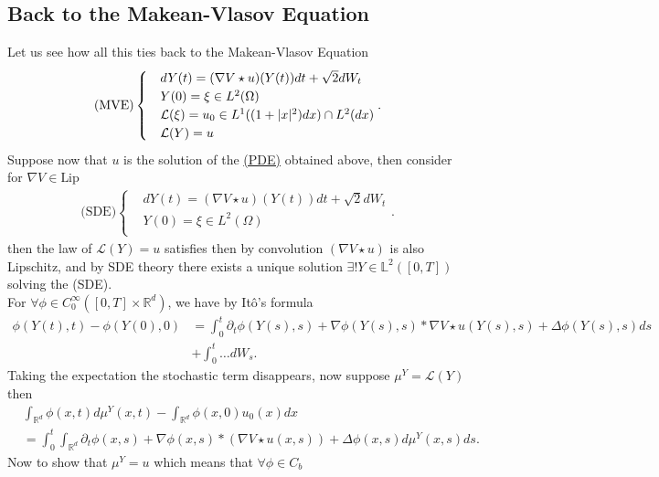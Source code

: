 \subsection{Back to the Makean-Vlasov Equation}
Let us see how all this ties back to the Makean-Vlasov Equation
\begin{align*}
  \text{(MVE)}\begin{cases}
    &dY(t) = (\nabla V \star  u)(Y(t)) dt + \sqrt{2}dW_t \\
    &Y(0)  = \xi \in  L^{2}(\Omega )\\
    &\mathcal{L}(\xi) = u_0 \in  L^{1}((1+\lvert x\rvert^2)dx) \cap L^{2}(dx) \\
    &\mathcal{L}(Y) = u
  \end{cases}
.\end{align*}
Suppose now that $u$ is the solution of the  \hyperref[pde_mve_apprach]{(PDE)} obtained above, then consider 
for $\nabla V \in  \text{Lip}$ 
\begin{align*} 
  \text{(SDE)}\begin{cases}
    &dY(t) = (\nabla V \star  u)(Y(t)) dt + \sqrt{2}dW_t \\
    &Y(0)  = \xi \in  L^{2}(\Omega )\\
  \end{cases}
.\end{align*}
then the law of $\mathcal{L}(Y) = u$ satisfies 
then by convolution  $(\nabla V \star  u)$ is also Lipschitz, and by SDE theory there exists a unique solution $\exists! Y \in  \mathbb{L}^2([0,T])$  solving the (SDE).\\[1ex]
For $\forall  \phi  \in   C_0^{\infty}([0,T] \times  \mathbb{R}^{d} ) $, we have by It\^o's formula 
\begin{align*}
  \phi(Y(t),t) - \phi(Y(0),0) &= \int_0^{t}  \partial_t \phi(Y(s),s) + \nabla \phi(Y(s),s)* \nabla V \star u(Y(s),s) +\Delta \phi(Y(s),s) ds \\
                              &+ \int_0^{t}  \ldots  dW_s
.\end{align*}
Taking the expectation the stochastic term disappears, now suppose $\mu ^{Y} = \mathcal{L}(Y) $ then
\begin{align*}
  &\int_{\mathbb{R}^{d} } \phi(x,t) d\mu ^{Y}(x,t) - \int_{\mathbb{R}^{d} } \phi(x,0) u_0(x) dx \\
  &= \int_0^{t} \int_{\mathbb{R}^{d} } \partial_t \phi(x,s) + \nabla \phi(x,s) *(\nabla V \star u(x,s)) + \Delta  \phi(x,s) d\mu ^{Y}(x,s)ds 
.\end{align*}
Now to show that $\mu^Y = u$ which means that $\forall  \phi  \in  C_b$ 
